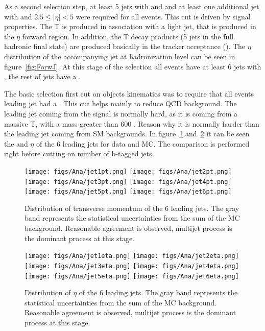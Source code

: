 As a second selection step, at least 5 jets with  and  and at least one additional jet with  and $2.5\leq |\eta|<5$ were required for all events. This cut is driven by signal properties. The T is produced in association with a light jet, that is produced in the $\eta$ forward region. In addition, the T decay products (5 jets in the full hadronic final state) are produced basically in the tracker acceptance (). The $\eta$ distribution of the accompanying jet at hadronization level can be seen in figure~\ref{fig:ForwJ}. At this stage of the selection all events have at least 6 jets with , the rest of jets have a . %

The basic selection first cut on objects kinematics was to require that all events leading jet had a . This cut helps mainly to reduce QCD background. The leading jet coming from the signal is normally hard, as it is coming from a massive T, with a mass greater than 600 \GeVcc. Reason why it is normally harder than the leading jet coming from SM backgrounds. In figure~\ref{fig:6jpt} and~\ref{fig:6jeta} it can be seen the \pt and $\eta$ of the 6 leading jets for data and MC. The comparison is performed right before cutting on number of b-tagged jets.

\begin{figure}[!Hhtbp]
  \begin{center}
    \texttt{[image: figs/Ana/jet1pt.png]}
    \texttt{[image: figs/Ana/jet2pt.png]}
    \texttt{[image: figs/Ana/jet3pt.png]}
    \texttt{[image: figs/Ana/jet4pt.png]}
    \texttt{[image: figs/Ana/jet5pt.png]}
    \texttt{[image: figs/Ana/jet6pt.png]}
    \caption{Distribution of transverse momentum of the 6 leading jets. The gray band represents the statistical uncertainties from the sum of the MC background. Reasonable agreement is observed, multijet process is the dominant process at this stage.}
    \label{fig:6jpt}
  \end{center}
\end{figure}

\begin{figure}[!Hhtbp]
  \begin{center}
    \texttt{[image: figs/Ana/jet1eta.png]}
    \texttt{[image: figs/Ana/jet2eta.png]}
    \texttt{[image: figs/Ana/jet3eta.png]}
    \texttt{[image: figs/Ana/jet4eta.png]}
    \texttt{[image: figs/Ana/jet5eta.png]}
    \texttt{[image: figs/Ana/jet6eta.png]}
    \caption{Distribution of $\eta$ of the 6 leading jets. The gray band represents the statistical uncertainties from the sum of the MC background. Reasonable agreement is observed, multijet process is the dominant process at this stage.}
    \label{fig:6jeta}
  \end{center}
\end{figure}

